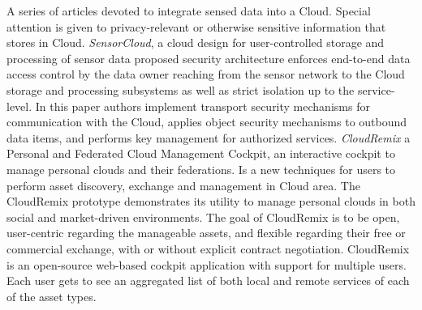 	A series of articles devoted to integrate sensed data into a Cloud. Special attention is given to privacy-relevant or otherwise sensitive information that stores in Cloud. \emph{SensorCloud}\cite{hummen2012cloud}, a cloud design for user-controlled storage and processing of sensor data proposed security architecture enforces end-to-end data access control by the data owner reaching from the sensor network to the Cloud storage and processing subsystems as well as strict isolation up to the service-level. In this paper authors implement transport security mechanisms for communication with the Cloud, applies object security mechanisms to outbound data items, and performs key management for authorized services. \emph{CloudRemix\cite{spillner2013personal}} a Personal and Federated Cloud Management Cockpit, an interactive cockpit to manage personal clouds and their federations. Is a new techniques for users to perform asset discovery, exchange and management in Cloud area. The CloudRemix prototype demonstrates its utility to manage personal clouds in both social and market-driven environments. The goal of CloudRemix is to be open, user-centric regarding the manageable assets, and flexible regarding their free or commercial exchange, with or without explicit contract negotiation. CloudRemix is an open-source web-based cockpit application with support for multiple users. Each user gets to see an aggregated list of both local and remote services of each of the asset types.

